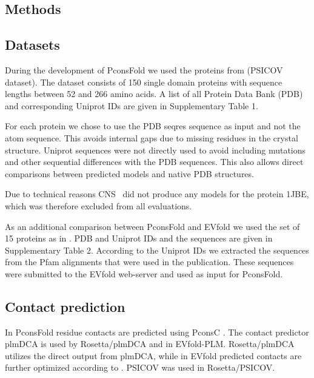 \documentclass{bioinfo}
\begin{document}
\begin{methods}
\section{Methods}

\subsection{Datasets}
During the development of PconsFold we used the proteins from
\citeauthor{jones_psicov:_2012} \citeyear{jones_psicov:_2012} (PSICOV
dataset). The dataset consists of 150 single domain proteins with sequence
lengths between 52 and 266 amino acids. A list of all Protein Data
Bank (PDB) \cite[]{berman_protein_2000} and corresponding Uniprot
\cite[]{magrane_uniprot_2011} IDs are given in Supplementary Table
1. 


For each protein we chose to use the PDB seqres sequence as input and
not the atom sequence. This avoids internal gaps due to missing
residues in the crystal structure.  Uniprot
sequences were not directly used to avoid including mutations and other sequential differences
with the PDB sequences. This also allows direct comparisons between predicted
models and native PDB structures. 

Due to technical reasons CNS~\cite[]{Brunger18007608} did not produce any models for the
protein 1JBE, which was therefore excluded from all evaluations.


As an additional comparison between PconsFold and EVfold we used the set
of 15 proteins as in \cite{marks_protein_2011}. PDB and Uniprot IDs and the sequences are given in
Supplementary Table 2. According to the Uniprot IDs we extracted the sequences from the
Pfam alignments that were used in the publication. These sequences were
submitted to the EVfold web-server and used as input for PconsFold.

\subsection{Contact prediction}
In PconsFold residue contacts are predicted using
PconsC \cite[]{skwark_PconsC:_2013}. The contact predictor
plmDCA \cite[]{ekeberg_improved_2013} is used by Rosetta/plmDCA and in
EVfold-PLM. Rosetta/plmDCA utilizes the direct output from plmDCA,
while in EVfold predicted contacts are further optimized according to
\cite{marks_protein_2011}. PSICOV \cite[]{jones_psicov:_2012} was used
in Rosetta/PSICOV.



\end{methods}
\end{document}

